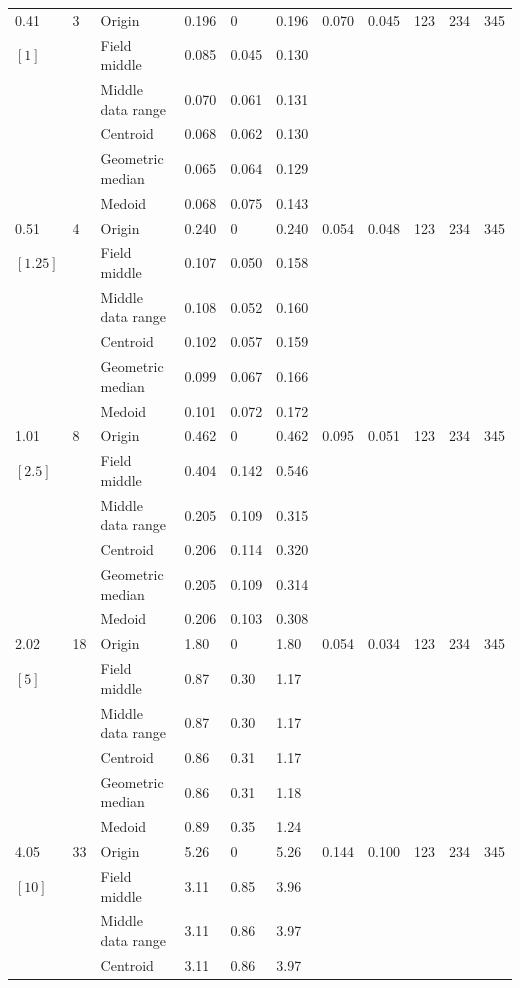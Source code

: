 \documentclass[phd]{ndsu-thesis-2022}
\begin{document}
\begin{landscape}
{{\begin{ThreePartTable}
\begin{longtable}{lll lll ll rrr}
0.41 & 3 & Origin  & 0.196 & 0 & 0.196 & 0.070 & 0.045 & 123 & 234 & 345\\
$[1]$ &  & Field middle  & 0.085 & 0.045 & 0.130 \\
 &  & Middle data range  & 0.070 & 0.061 & 0.131 \\
 &  & Centroid & 0.068 & 0.062 & 0.130 \\
 &  & Geometric median & 0.065 & 0.064 & 0.129 \\
 &  & Medoid  & 0.068 & 0.075 & 0.143 \\
\midrule
0.51 & 4 & Origin  & 0.240 & 0 & 0.240 & 0.054 & 0.048 & 123 & 234 & 345\\
$[1.25]$ &  & Field middle  & 0.107 & 0.050 & 0.158 \\
 &  & Middle data range  & 0.108 & 0.052 & 0.160 \\
 &  & Centroid & 0.102 & 0.057 & 0.159 \\
 &  & Geometric median & 0.099 & 0.067 & 0.166 \\
 &  & Medoid  & 0.101 & 0.072 & 0.172 \\
\midrule
1.01 & 8 & Origin  & 0.462 & 0 & 0.462 & 0.095 & 0.051  & 123 & 234 & 345\\
$[2.5]$ &  & Field middle  & 0.404 & 0.142 & 0.546 \\
 &  & Middle data range  & 0.205 & 0.109 & 0.315 \\
 &  & Centroid & 0.206 & 0.114 & 0.320 \\
 &  & Geometric median & 0.205 & 0.109 & 0.314 \\
 &  & Medoid  & 0.206 & 0.103 & 0.308 \\
\midrule
2.02 & 18 & Origin  & 1.80 & 0 & 1.80 & 0.054 & 0.034 & 123 & 234 & 345 \\
$[5]$ &  & Field middle  & 0.87 & 0.30 & 1.17 \\
 &  & Middle data range  & 0.87 & 0.30 & 1.17 \\
 &  & Centroid & 0.86 & 0.31 & 1.17 \\
 &  & Geometric median & 0.86 & 0.31 & 1.18 \\
 &  & Medoid  & 0.89 & 0.35 & 1.24 \\
\midrule
4.05 & 33 & Origin  & 5.26 & 0 & 5.26 & 0.144 & 0.100 & 123 & 234 & 345 \\
$[10]$ &  & Field middle  & 3.11 & 0.85 & 3.96 \\
 &  & Middle data range  & 3.11 & 0.86 & 3.97 \\
 &  & Centroid & 3.11 & 0.86 & 3.97 \\

\end{longtable}
\end{ThreePartTable}}}
\end{landscape}
\end{document}
